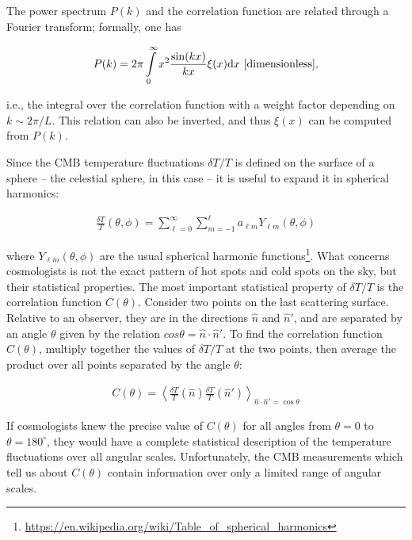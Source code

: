 \documentclass[a4paper,11pt]{article}
\begin{document}
{\noindent}The power spectrum $P(k)$ and the correlation function are related through a Fourier transform; formally, one has

\begin{align*}
    P(k) = 2\pi \int\limits_0^\infty x^2\frac{\sin(kx)}{kx}\xi(x)\mathrm{d}x ~ [{\rm dimensionless}],
\end{align*}

{\noindent}i.e., the integral over the correlation function with a weight factor depending on $k\sim2\pi/L$. This relation can also be inverted, and thus $\xi(x)$ can be computed from $P(k)$.

{\noindent}Since the CMB temperature fluctuations $\delta T/T$ is defined on the surface of a sphere -- the celestial sphere, in this case -- it is useful to expand it in spherical harmonics:

\begin{align*}
    \frac{\delta T}{T}(\theta,\phi) = \sum\limits_{\ell=0}^{\infty}\sum\limits_{m=-1}^{\ell} a_{\ell m}Y_{\ell m}(\theta,\phi)
\end{align*}

{\noindent}where $Y_{\ell m}(\theta,\phi)$ are the usual spherical harmonic functions\footnote{\href{https://en.wikipedia.org/wiki/Table\_of\_spherical\_harmonics}{https://en.wikipedia.org/wiki/Table\_of\_spherical\_harmonics}}. What concerns cosmologists is not the exact pattern of hot spots and cold spots on the sky, but their statistical properties. The most important statistical property of $\delta T/T$ is the correlation function $C(\theta)$. Consider two points on the last scattering surface. Relative to an observer, they are in the directions $\hat{n}$ and $\hat{n}'$, and are separated by an angle $\theta$ given by the relation $cos\theta=\hat{n}\cdot\hat{n}'$. To find the correlation function $C(\theta)$, multiply together the values of $\delta T/T$ at the two points, then average the product over all points separated by the angle $\theta$:

\begin{align*}
    C(\theta) = \left\langle\frac{\delta T}{T}(\hat{n})\frac{\delta T}{T}(\hat{n}')\right\rangle_{\hat{n}\cdot\hat{n}'=\cos\theta}
\end{align*}

{\noindent}If cosmologists knew the precise value of $C(\theta)$ for all angles from $\theta=0$ to $\theta=180^\circ$, they would have a complete statistical description of the temperature fluctuations over all angular scales. Unfortunately, the CMB measurements which tell us about $C(\theta)$ contain information over only a limited range of angular scales.
\end{document}
